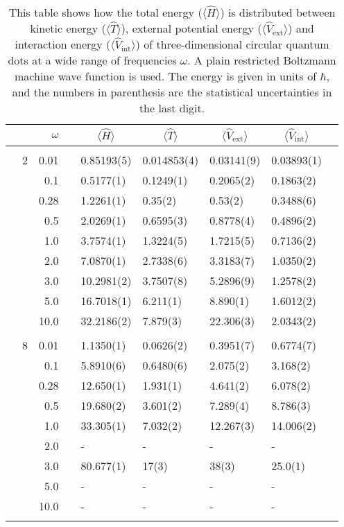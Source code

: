 \begin{table}[H]
	\caption{This table shows how the total energy ($\langle\hat{H}\rangle$) is distributed between kinetic energy ($\langle\hat{T}\rangle$), external potential energy ($\langle\hat{V}_{\text{ext}}\rangle$) and interaction energy ($\langle\hat{V}_{\text{int}}\rangle$) of three-dimensional circular quantum dots at a wide range of frequencies $\omega$. A plain restricted Boltzmann machine wave function is used. The energy is given in units of $\hbar$, and the numbers in parenthesis are the statistical uncertainties in the last digit.}
	\label{tab:splitfrequencyQDRBM3D}
	\begin{tabularx}{\textwidth}{R{1cm}rrcR{2.3cm}R{2.3cm}R{2.3cm}R{2.3cm}R{1cm}} \hline\hline
		&\makecell{\\ \phantom{$N$} \\ \phantom{=}} & $\omega$ &&  &  &  &  & \\ \hline \\
		&2 & 0.01 && 0.85193(5) & 0.014853(4) & 0.03141(9) & 0.03893(1) \\
		&& 0.1 && 0.5177(1) & 0.1249(1) & 0.2065(2) & 0.1863(2) \\
		&& 0.28 && 1.2261(1) & 0.35(2) & 0.53(2) & 0.3488(6) \\
		&& 0.5 && 2.0269(1) & 0.6595(3) & 0.8778(4) & 0.4896(2) \\
		&& 1.0 && 3.7574(1) & 1.3224(5) & 1.7215(5) & 0.7136(2) \\
		&& 2.0 && 7.0870(1) & 2.7338(6) & 3.3183(7) & 1.0350(2) \\
		&& 3.0 && 10.2981(2) & 3.7507(8) & 5.2896(9) & 1.2578(2) \\ 
		&& 5.0 && 16.7018(1) & 6.211(1) & 8.890(1) & 1.6012(2) \\
		&& 10.0 && 32.2186(2) & 7.879(3) & 22.306(3) & 2.0343(2) \\
		\hdashline \\
		
		&8 & 0.01 && 1.1350(1) & 0.0626(2) & 0.3951(7) & 0.6774(7) \\
		&& 0.1 && 5.8910(6) & 0.6480(6) & 2.075(2) & 3.168(2) \\
		&& 0.28 && 12.650(1) & 1.931(1) & 4.641(2) & 6.078(2) \\
		&& 0.5 && 19.680(2) & 3.601(2) & 7.289(4) & 8.786(3) \\
		&& 1.0 && 33.305(1) & 7.032(2) & 12.267(3) & 14.006(2) \\
		&& 2.0 && - & - & - & -\\
		&& 3.0 && 80.677(1) & 17(3) & 38(3) & 25.0(1) \\ 
		&& 5.0 && - & - & - & -\\
		&& 10.0 && - & - & - & -\\
		\hdashline \\
		

\end{tabularx}
\end{table}
